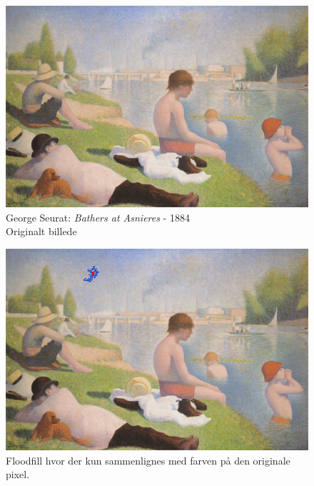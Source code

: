 {%
\begin{figure}[!h]
    \begin{center}
        \includegraphics[scale=8]{afsnit/vores_implementation/billeder/flood_fill/seurat_bathers}
    \end{center}
    \caption[George Seurat: \emph{Bathers at Asnieres} - 1884]{George
    Seurat: \emph{Bathers at Asnieres} - 1884\\Originalt billede}
    \label{bathers}
\end{figure}

\begin{figure}[!h]
    \begin{center}
        \includegraphics[scale=0.49]{afsnit/vores_implementation/billeder/flood_fill/dot_ff_fixed_7_7}
    \end{center}
    \caption[]{Floodfill hvor der kun sammenlignes med farven på den
    originale pixel.}
    \label{dot_ff_fixed_7_7}
\end{figure}

}
